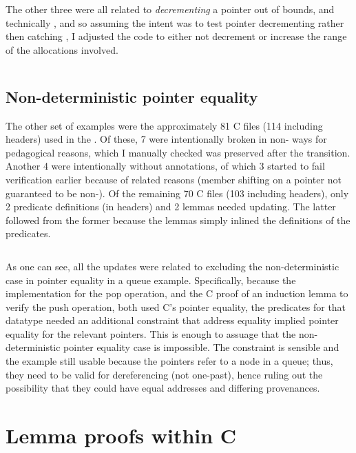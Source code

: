 The other three were all related to \emph{decrementing} a pointer out of
bounds, and technically , and so assuming the intent was to test pointer
decrementing rather then catching , I adjusted the code to either not
decrement or increase the range of the allocations involved.

\inputminted[fontsize=\footnotesize,breaklines,firstline=69,lastline=107]{diff}{code/add_support_for_vip.patch}

\subsection{Non-deterministic pointer equality}

The other set of examples were the approximately 81 C files (114 including
headers) used in the . Of these, 7 were intentionally broken in
non- ways for pedagogical reasons, which I manually checked was
preserved after the transition. Another 4 were intentionally without
annotations, of which 3 started to fail verification earlier because of
 related reasons (member shifting on a pointer not guaranteed to be
non-). Of the remaining 70 C files (103 including headers), only
2 predicate definitions (in headers) and 2 lemmas needed updating. The latter
followed from the former because the lemmas simply inlined the definitions of
the predicates.

\inputminted[fontsize=\footnotesize,breaklines,firstline=108]{diff}{code/add_support_for_vip.patch}

As one can see, all the updates were related to excluding the non-deterministic
case in pointer equality in a queue example.
Specifically, because the implementation for the pop operation, and the C proof
of an induction lemma to verify the push operation, both used C's pointer
equality, the predicates for that datatype needed an additional constraint that
address equality implied pointer equality for the relevant pointers. This is
enough to assuage  that the non-deterministic pointer equality case
is impossible. The constraint is sensible and the example still usable because
the pointers refer to a node in a queue; thus, they need to be valid for
dereferencing (not one-past), hence ruling out the possibility that they could
have equal addresses and differing provenances.

\section{Lemma proofs within C}\label{sec:lemma-proof-c}

